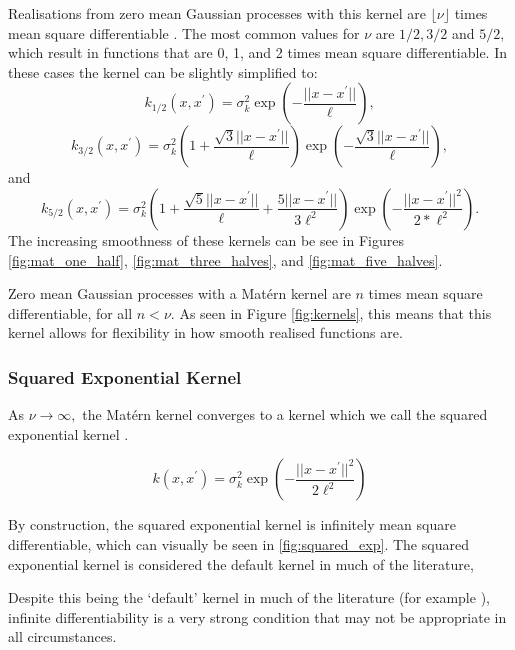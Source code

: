 Realisations from zero mean Gaussian processes with this kernel are
$\lfloor\nu\rfloor$ times mean square differentiable
\parencite{rasmussen_gaussian_2008}.
The most common values for $\nu$ are $1/2, 3/2$ and $5/2,$ which result in
functions that are 0, 1, and 2 times mean square differentiable. In these cases
the kernel can be slightly simplified to:
$$
    k_{1/2}(x, x^\prime)
    = \sigma^2_k\exp\left(-\frac{||x - x^\prime||}{\ell}\right),
$$
$$
    k_{3/2}(x, x^\prime)
    = \sigma^2_k
    \left(1 + \frac{\sqrt{3}||x - x^\prime||}{\ell}\right)
    \exp\left(-\frac{\sqrt{3}||x - x^\prime||}{\ell}\right),
$$
and
$$
    k_{5/2}(x, x^\prime)
    = \sigma^2_k
    \left(
    1 + \frac{\sqrt{5}||x - x^\prime||}{\ell} + \frac{5||x - x^\prime||}{3\ell^2}
    \right)
    \exp\left(-\frac{||x - x^\prime||^2}{2*\ell^2}\right).
$$
The increasing smoothness of these kernels can be see in Figures
\ref{fig:mat_one_half}, \ref{fig:mat_three_halves},
and \ref{fig:mat_five_halves}.

Zero mean Gaussian processes with a Mat\'ern kernel are $n$ times mean square
differentiable, for all $n < \nu.$ As seen in Figure \ref{fig:kernels}, this
means that this kernel allows for flexibility in how smooth realised functions
are.

\subsubsection*{Squared Exponential Kernel}

As $\nu\to\infty,$ the Mat\'ern kernel converges to a kernel which we call
the squared exponential
kernel \parencite[85]{rasmussen_gaussian_2008}.

\begin{definition}
    $$
        k(x, x^\prime)
        = \sigma^2_k\exp\left(-\frac{||x - x^\prime||^2}{2\ell^2}\right)
    $$
\end{definition}

By construction, the squared exponential kernel is infinitely
mean square differentiable, which can visually be seen in \ref{fig:squared_exp}.
The squared exponential kernel is considered
the default kernel in much of the literature,

Despite this being the `default' kernel in much of
the literature (for example \cite{gutmann_bayesian_2016}), infinite
differentiability is a very strong condition that may not be appropriate in
all circumstances.


